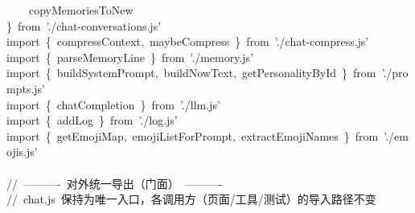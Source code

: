 \documentclass[a4paper,10pt]{article}
\begin{document}
{~~~~copyMemoriesToNew\\
\}~from~'./chat-conversations.js'\\
import~\{~compressContext,~maybeCompress~\}~from~'./chat-compress.js'\\
import~\{~parseMemoryLine~\}~from~'./memory.js'\\
import~\{~buildSystemPrompt,~buildNowText,~getPersonalityById~\}~from~'./prompts.js'\\
import~\{~chatCompletion~\}~from~'./llm.js'\\
import~\{~addLog~\}~from~'./log.js'\\
import~\{~getEmojiMap,~emojiListForPrompt,~extractEmojiNames~\}~from~'./emojis.js'\\
\mbox{}\\
//~----------~对外统一导出（门面）~----------\\
//~chat.js~保持为唯一入口，各调用方（页面/工具/测试）的导入路径不变
}

\newpage
\end{document}

